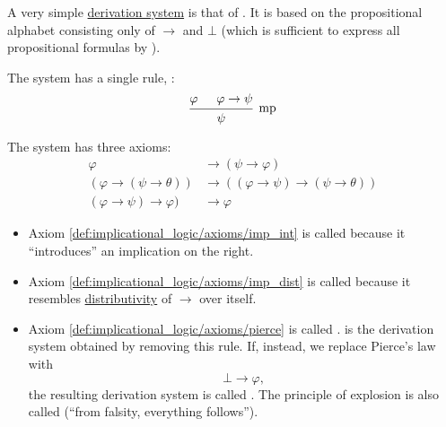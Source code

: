 \begin{definition}\label{def:propositional_implicational_logic}
  A very simple \hyperref[def:first_order_derivation_system]{derivation system} is that of . It is based on the propositional alphabet consisting only of \( \to \) and \( \bot \) (which is sufficient to express all propositional formulas by ).

  \begin{reflist}
     The system has a single rule, :
    \begin{equation}\label{eq:def:implicational_logic/rules/modus_ponens}
      \begin{prooftree}
        \hypo{\varphi}
        \hypo{\varphi \to \psi}
        \infer2[mp]{\psi}
      \end{prooftree}
    \end{equation}

     The system has three axioms:
    \begin{align}
      \varphi                         &\to (\psi \to \varphi)                         \label{def:implicational_logic/axioms/imp_int} \\
      (\varphi \to (\psi \to \theta)) &\to ((\varphi \to \psi) \to (\psi \to \theta)) \label{def:implicational_logic/axioms/imp_dist} \\
      (\varphi \to \psi) \to \varphi) &\to \varphi                                    \label{def:implicational_logic/axioms/pierce}
    \end{align}

    \begin{itemize}
      \item Axiom \eqref{def:implicational_logic/axioms/imp_int} is called  because it \enquote{introduces} an implication on the right.
      \item Axiom \eqref{def:implicational_logic/axioms/imp_dist} is called  because it resembles \hyperref[def:distributive_lattice]{distributivity} of \( \to \) over itself.
      \item Axiom \eqref{def:implicational_logic/axioms/pierce} is called .  is the derivation system obtained by removing this rule. If, instead, we replace Pierce's law with 
      \begin{equation}\label{def:implicational_logic/axioms/explosion}
        \bot \to \varphi,
      \end{equation}
      the resulting derivation system is called . The principle of explosion is also called  (\enquote{from falsity, everything follows}).


\end{itemize}
\end{reflist}
\end{definition}

